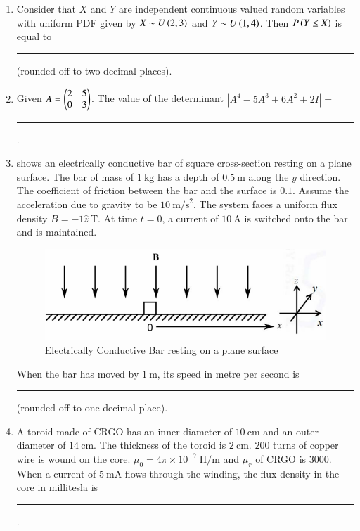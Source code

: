 \documentclass[journal,12pt,onecolumn]{IEEEtran}
\theoremstyle{remark}
\begin{document}
\begin{enumerate}
\item Consider that $X$ and $Y$ are independent continuous valued random variables with uniform PDF given by $X \sim U\left(2,3\right)$ and $Y \sim U\left(1,4\right)$. Then $P\left(Y \le X\right)$ is equal to \rule{1.5cm}{0.4pt} (rounded off to two decimal places). \par \hfill{}

\item Given $A = \begin{pmatrix}2&5 \\ 0&3\end{pmatrix}$.  
The value of the determinant $|A^4 -5A^3 +6A^2 +2I| =$ \rule{1.5cm}{0.4pt}. \par \hfill{}

\item \figref{;;} shows an electrically conductive bar of square cross-section resting on a plane surface. The bar of mass of $1\ \text{kg}$ has a depth of $0.5\ \text{m}$ along the $y$ direction. The coefficient of friction between the bar and the surface is $0.1$. Assume the acceleration due to gravity to be $10\ \text{m/s}^2$. The system faces a
uniform flux density $B = -1\hat{z}\ \text{T}$. At time $t=0$, a current of $10\ \text{A}$ is switched onto the bar and is maintained.
\begin{figure}[H]
    \centering
    \includegraphics[width=0.5\linewidth]{Figs/Q-39.png}
    \caption{Electrically Conductive Bar resting on a plane surface}
    \label{;;}
\end{figure}
When the bar has moved by $1\ \text{m}$, its speed in metre per second is
\rule{1.5cm}{0.4pt} (rounded off to one decimal place). \par \hfill{}

\item A toroid made of CRGO has an inner diameter of $10\ \text{cm}$ and an outer diameter of $14\ \text{cm}$. The thickness of the toroid is $2\ \text{cm}$. $200$ turns of copper wire is wound on the core. $\mu_0 = 4\pi\times10^{-7}\ \text{H/m}$ and $\mu_r$ of CRGO is $3000$. When
a current of $5\ \text{mA}$ flows through the winding, the flux density in the core in millitesla is \rule{1.5cm}{0.4pt}. \par \hfill{}


\end{enumerate}
\end{document}
